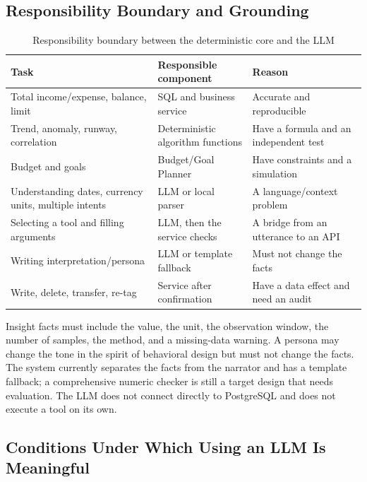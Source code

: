 \subsection{Responsibility Boundary and Grounding}

\begin{table}[htbp]
  \centering
  \caption{Responsibility boundary between the deterministic core and the LLM}
  \label{tab:llm-responsibility}
  \small
  \begin{tabularx}{\textwidth}{|p{3.8cm}|p{4.0cm}|X|}
    \hline
    \textbf{Task} & \textbf{Responsible component} &
    \textbf{Reason} \\ \hline
    Total income/expense, balance, limit & SQL and business service &
    Accurate and reproducible \\ \hline
    Trend, anomaly, runway, correlation & Deterministic algorithm
    functions & Have a formula and an independent test \\ \hline
    Budget and goals & Budget/Goal Planner & Have constraints and a
    simulation \\ \hline
    Understanding dates, currency units, multiple intents & LLM or local
    parser & A language/context problem \\ \hline
    Selecting a tool and filling arguments & LLM, then the service
    checks & A bridge from an utterance to an API \\ \hline
    Writing interpretation/persona & LLM or template fallback & Must not
    change the facts \\ \hline
    Write, delete, transfer, re-tag & Service after confirmation & Have a
    data effect and need an audit \\ \hline
  \end{tabularx}
\end{table}

Insight facts must include the value, the unit, the observation window,
the number of samples, the method, and a missing-data warning. A persona
may change the tone in the spirit of behavioral design \cite{thaler2009}
but must not change the facts. The system currently separates the facts
from the narrator and has a template fallback; a comprehensive numeric
checker is still a target design that needs evaluation. The LLM does not
connect directly to PostgreSQL and does not execute a tool on its own.

\subsection{Conditions Under Which Using an LLM Is Meaningful}

